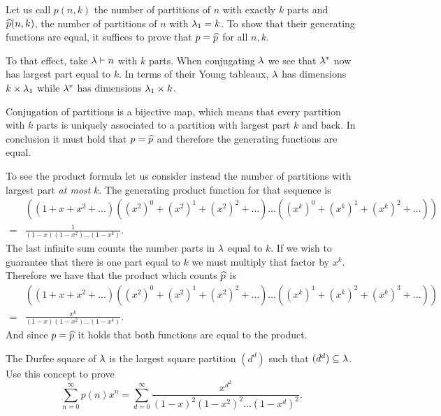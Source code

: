\documentclass[12pt]{memoir}
\begin{document}
\begin{ptcbr}
Let us call $p(n,k)$ the number of partitions of $n$ with exactly $k$ parts and $\widehat{p}(n,k)$, the number of partitions of $n$ with $\lambda_1=k$. To show that their generating functions are equal, it suffices to prove that $p=\widehat{p}$ for all $n,k$.\par
To that effect, take $\lambda\vdash n$ with $k$ parts. When conjugating $\lambda$ we see that $\lambda^\ast$ now has largest part equal to $k$. In terms of their Young tableaux, $\lambda$ has dimensions $k\times\lambda_1$ while $\lambda^\ast$ has dimensions $\lambda_1\times k$.\par 
Conjugation of partitions is a bijective map, which means that every partition with $k$ parts is uniquely associated to a partition with largest part $k$ and back. In conclusion it must hold that $p=\widehat{p}$ and therefore the generating functions are equal.\par
To see the product formula let us consider instead the number of partitions with largest part \emph{at most} $k$. The generating product function for that sequence is 
\begin{align*}
    &\left((1+x+x^2+\dots)((x^2)^0+(x^2)^1+(x^2)^2+\dots)\dots((x^k)^0+(x^k)^1+(x^k)^2+\dots)\right)\\
    =&\frac{1}{(1-x)(1-x^2)\dots(1-x^k)}.
\end{align*}
The last infinite sum counts the number parts in $\lambda$ equal to $k$. If we wish to guarantee that there is one part equal to $k$ we must multiply that factor by $x^k$. Therefore we have that the product which counts $\widehat{p}$ is 
\begin{align*}
    &\left((1+x+x^2+\dots)((x^2)^0+(x^2)^1+(x^2)^2+\dots)\dots((x^k)^1+(x^k)^2+(x^k)^3+\dots)\right)\\
    =&\frac{x^k}{(1-x)(1-x^2)\dots(1-x^k)}.
\end{align*}
And since $p=\widehat{p}$ it holds that both functions are equal to the product.
\end{ptcbr}

\begin{Ej}
    The Durfee square of $\lambda$ is the largest square partition $(d^d)$ such that $(d^d)\subseteq \lambda$. Use this concept to prove
    $$\sum_{n=0}^\infty p(n)x^n=\sum_{d=0}^\infty \frac{x^{d^2}}{(1-x)^2(1-x^2)^2\dots(1-x^d)^2}.$$
\end{Ej}
\end{document}
